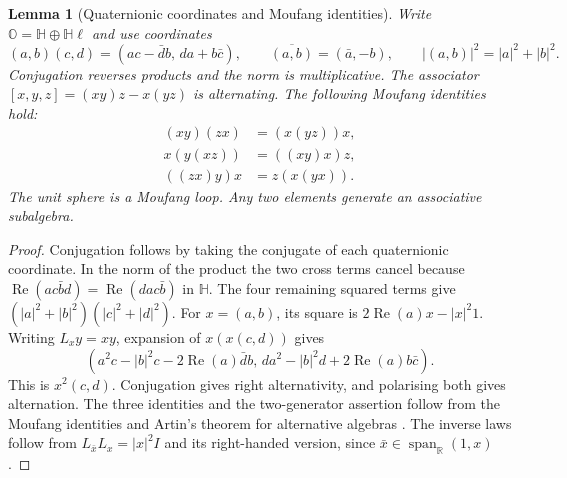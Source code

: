 \documentclass[aps,pra,onecolumn,superscriptaddress,nofootinbib,10pt]{revtex4-2}
\newtheorem{lemma}[theorem]{Lemma}
\theoremstyle{definition}
\theoremstyle{remark}
\begin{document}
\begin{lemma}[Quaternionic coordinates and Moufang identities]\label{tr:oct}
Write \(\mathbb O=\mathbb H\oplus\mathbb H\ell\) and use coordinates
\[
 (a,b)(c,d)=(ac-\bar d b,\,da+b\bar c),\qquad
 \overline{(a,b)}=(\bar a,-b),\qquad |(a,b)|^2=|a|^2+|b|^2 .
\]
Conjugation reverses products and the norm is multiplicative. The
associator \([x,y,z]=(xy)z-x(yz)\) is alternating. The following
Moufang identities hold:
\begin{align*}
 (xy)(zx)&=(x(yz))x,\\
 x(y(xz))&=((xy)x)z,\\
 ((zx)y)x&=z(x(yx)).
\end{align*}
The unit sphere is a Moufang loop. Any two elements generate an
associative subalgebra.
\end{lemma}
\begin{proof}
Conjugation follows by taking the conjugate of each quaternionic
coordinate. In the norm of the product the two cross terms cancel
because \(\operatorname{Re}(ac\bar b d)=\operatorname{Re}(da c\bar b)\)
in \(\mathbb H\). The four remaining squared terms give
\((|a|^2+|b|^2)(|c|^2+|d|^2)\).
For \(x=(a,b)\), its square is \(2\operatorname{Re}(a)x-|x|^2 1\).
Writing \(L_x y=xy\), expansion of \(x(x(c,d))\) gives
\[
 (a^2c-|b|^2c-2\operatorname{Re}(a)\bar d b,\,
 da^2-|b|^2d+2\operatorname{Re}(a)b\bar c).
\]
This is \(x^2(c,d)\). Conjugation gives right alternativity, and
polarising both gives alternation. The three identities and the
two-generator assertion follow from the Moufang identities and
Artin's theorem for alternative algebras \cite[Chapter~III, \S1]{tr:Schafer}.
The inverse laws follow from
\(L_{\bar x}L_x=|x|^2 I\) and its right-handed version, since
\(\bar x\in\operatorname{span}_{\mathbb R}(1,x)\).
\end{proof}
\end{document}
